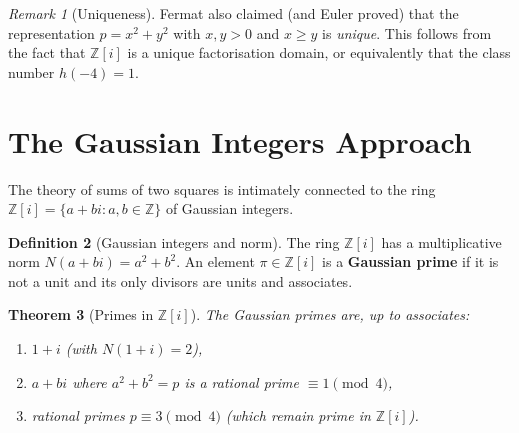 \documentclass[12pt,a4paper,openany]{book}
\theoremstyle{definition}
\newtheorem{definition}{Definition}[chapter]
\theoremstyle{plain}
\newtheorem{theorem}[definition]{Theorem}
\theoremstyle{remark}
\newtheorem{remark}[definition]{Remark}
\newcommand{\Z}{\mathbb{Z}}
\begin{document}
\begin{remark}[Uniqueness]\label{rem:unique-two-sq}
Fermat also claimed (and Euler proved) that the representation $p = x^2 + y^2$
with $x,y > 0$ and $x \ge y$ is \emph{unique}.  This follows from the fact that
$\Z[i]$ is a unique factorisation domain, or equivalently that the class
number $h(-4) = 1$.
\end{remark}

\section{The Gaussian Integers Approach}\label{sec:gaussian-integers}

The theory of sums of two squares is intimately connected to the ring
$\Z[i] = \{a + bi : a,b \in \Z\}$ of Gaussian integers.

\begin{definition}[Gaussian integers and norm]\label{def:gaussian-int}
The ring $\Z[i]$\index{$\Z[i]$} has a multiplicative norm
$N(a+bi) = a^2 + b^2$.
An element $\pi \in \Z[i]$ is a \textbf{Gaussian prime}
if it is not a unit and its only divisors are units and associates.
\end{definition}

\begin{theorem}[{Primes in $\Z[i]$}]\label{thm:gaussian-primes}
The Gaussian primes are, up to associates:
\begin{enumerate}[label=(\roman*)]
  \item $1+i$ (with $N(1+i)=2$),
  \item $a + bi$ where $a^2+b^2 = p$ is a rational prime $\equiv 1\pmod{4}$,
  \item rational primes $p \equiv 3 \pmod{4}$ (which remain prime in $\Z[i]$).
\end{enumerate}
\end{theorem}
\end{document}
